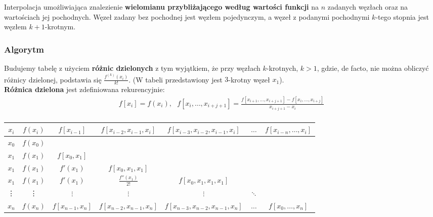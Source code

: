 \documentclass[main.tex]{subfiles}
\begin{document}
    Interpolacja umożliwiająca znalezienie \textbf{wielomianu przybliżającego według wartości funkcji} na $n$ zadanych węzłach
    oraz na wartościach jej pochodnych.
    Węzeł zadany bez pochodnej jest węzłem pojedynczym, a węzeł z podanymi pochodnymi $k$-tego stopnia jest węzłem
    $k+1$-krotnym.

    \subsubsection{Algorytm}

    Budujemy tabelę z użyciem \textbf{różnic dzielonych} z tym wyjątkiem, że przy węzłach $k$-krotnych, $k>1$, gdzie,
    de facto, nie można obliczyć różnicy dzielonej, podstawia się $\frac{f^{(k)}(x_i)}{k!}$. (W tabeli przedstawiony jest
    $3$-krotny węzeł $x_{1}$).\\

    \textbf{Różnica dzielona} jest zdefiniowana rekurencyjnie:
    \begin{gather*}
        f[x_{i}]=f(x_{i}), ~~~
        f[x_{i},\ldots ,x_{i+j+1}]= \frac {f[x_{i+1},\ldots ,x_{i+j+1}]-f[x_{i},\ldots ,x_{i+j}]}{x_{i+j+1}-x_{i}}\\
    \end{gather*}


    \begin{tabular}{|c|c|cccll}
        \hline
        $x_i$ &
        $f(x_i)$ &
        \multicolumn{1}{c|}{$f[x_{i-1}]$} &
        \multicolumn{1}{c|}{$f[x_{i-2},x_{i-1},x_i]$} &
        \multicolumn{1}{c|}{$f[x_{i-3},x_{i-2},x_{i-1},x_i]$} &
        \multicolumn{1}{c|}{$\dots$} &
        \multicolumn{1}{c|}{$f[x_{i-n},\dots,x_i]$} \\ \hline
        $x_0$ &
        $f(x_0)$ &
        &
        &
        \multicolumn{1}{l}{} &
        &
        \\ \cline{1-3}
        $x_1$ &
        $f(x_1)$ &
        \multicolumn{1}{c|}{$f[x_0,x_1]$} &
        &
        \multicolumn{1}{l}{} &
        &
        \\ \cline{1-4}
        $x_1$ &
        $f(x_1)$ &
        \multicolumn{1}{c|}{$f'(x_1)$} &
        \multicolumn{1}{c|}{$f[x_0,x_1,x_1]$} &
        \multicolumn{1}{l}{} &
        &
        \\ \cline{1-5}
        $x_1$ &
        $f(x_1)$ &
        \multicolumn{1}{c|}{$f'(x_1)$} &
        \multicolumn{1}{c|}{$\frac{f''(x_1)}{2!}$} &
        \multicolumn{1}{c|}{$f[x_0,x_1,x_1,x_1]$} &
        &
        \\ \cline{1-6}
        \vdots &
        \vdots &
        \multicolumn{1}{c|}{$\vdots$} &
        \multicolumn{1}{c|}{$\vdots$} &
        \multicolumn{1}{c|}{$\vdots$} &
        \multicolumn{1}{c|}{$\ddots$} &
        \\ \hline
        $x_n$ &
        $f(x_n)$ &
        \multicolumn{1}{c|}{$f[x_{n-1},x_n]$} &
        \multicolumn{1}{c|}{$f[x_{n-2},x_{n-1},x_n]$} &
        \multicolumn{1}{c|}{$f[x_{n-3},x_{n-2},x_{n-1},x_n]$} &
        \multicolumn{1}{c|}{$\dots$} &
        \multicolumn{1}{c|}{$f[x_0,\dots,x_n]$} \\ \hline
    \end{tabular}\\\\
\end{document}
